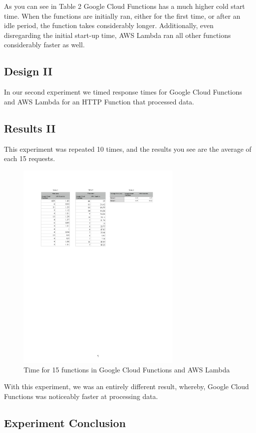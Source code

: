 \documentclass[10pt, conference]{IEEEtran}
\begin{document}
As you can see in Table 2 Google Cloud Functions has a much higher cold start time. When the functions are initially ran, either for the first time, or after an idle period, the function takes considerably longer. Additionally, even disregarding the initial start-up time, AWS Lambda ran all other functions considerably faster as well. 

\subsection{Design II}
In our second experiment we timed response times for Google Cloud Functions and AWS Lambda for an HTTP Function that processed data. 

\subsection{Results II}
This experiment was repeated 10 times, and the results you see are the average of each 15 requests. 

\begin{figure}[htbp]
\centerline{\includegraphics[width=8cm]{table3.PDF}}
\caption{Time for 15 functions in Google Cloud Functions and AWS Lambda}
\label{fig}
\end{figure}

With this experiment, we was an entirely different result, whereby, Google Cloud Functions was noticeably faster at processing data. 

\subsection{Experiment Conclusion}
\end{document}
